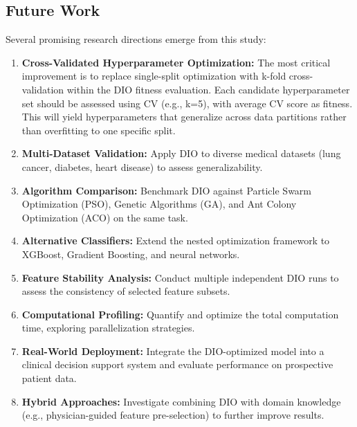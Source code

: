 \documentclass[12pt, a4paper]{article}
\begin{document}
\subsection{Future Work}
Several promising research directions emerge from this study:
\begin{enumerate}
    \item \textbf{Cross-Validated Hyperparameter Optimization:} The most critical improvement is to replace single-split optimization with k-fold cross-validation within the DIO fitness evaluation. Each candidate hyperparameter set should be assessed using CV (e.g., k=5), with average CV score as fitness. This will yield hyperparameters that generalize across data partitions rather than overfitting to one specific split.
    
    \item \textbf{Multi-Dataset Validation:} Apply DIO to diverse medical datasets (lung cancer, diabetes, heart disease) to assess generalizability.
    
    \item \textbf{Algorithm Comparison:} Benchmark DIO against Particle Swarm Optimization (PSO), Genetic Algorithms (GA), and Ant Colony Optimization (ACO) on the same task.
    
    \item \textbf{Alternative Classifiers:} Extend the nested optimization framework to XGBoost, Gradient Boosting, and neural networks.
    
    \item \textbf{Feature Stability Analysis:} Conduct multiple independent DIO runs to assess the consistency of selected feature subsets.
    
    \item \textbf{Computational Profiling:} Quantify and optimize the total computation time, exploring parallelization strategies.
    
    \item \textbf{Real-World Deployment:} Integrate the DIO-optimized model into a clinical decision support system and evaluate performance on prospective patient data.
    
    \item \textbf{Hybrid Approaches:} Investigate combining DIO with domain knowledge (e.g., physician-guided feature pre-selection) to further improve results.
\end{enumerate}

\end{document}
